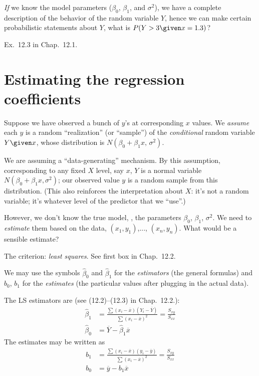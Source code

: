 \documentclass[12pt]{article}
\begin{document}
\emph{If} we know the model parameters
($\beta_0$, $\beta_1$, and $\sigma^2$),
we have a complete description of the behavior
of the random variable $Y$,
hence we can make certain probabilistic statements about $Y$,
\eg what is $P(Y > 3 \given x = 1.3)$?

\example Ex.~12.3 in Chap.~12.1.


\section{Estimating the regression coefficients}

Suppose we have observed a bunch of $y$'s at corresponding $x$ values.
We \emph{assume} each $y$ is a random ``realization'' (or ``sample'')
of the \emph{conditional} random variable
$Y\given x$, whose distribution is $N(\beta_0 + \beta_1 x,\, \sigma^2)$.

\alert
We are assuming a ``data-generating'' mechanism.
By this assumption,
corresponding to any fixed $X$ level, say $x$,
$Y$ is a normal variable $N(\beta_0 + \beta_1 x, \sigma^2)$;
our observed value $y$ is a random sample from this distribution.
(This also reinforces the interpretation about $X$:
it's not a random variable; it's whatever level of the predictor
that we ``use''.)

However, we don't know the true model,
\ie, the parameters $\beta_0$, $\beta_1$, $\sigma^2$.
We need to \emph{estimate} them based on the data,
$(x_1,y_1)$,..., $(x_n, y_n)$.
What would be a sensible estimate?

The criterion: \emph{least squares}.
See first box in Chap.~12.2.


We may use the symbols $\hat{\beta}_0$ and $\hat{\beta}_1$
for the \emph{estimators} (the general formulas)
and $b_0$, $b_1$ for the \emph{estimates} (the particular values after
plugging in the actual data).

The LS estimators are (see (12.2)--(12.3) in Chap.~12.2.):
\begin{equation}\label{eq:LS-estimator}
\begin{split}
\hat{\beta}_1 &= \frac{\sum(x_i - \overline{x})(Y_i - \overline{Y})}
        {\sum(x_i - \overline{x})^2}
    = \frac{S_{xy}}{S_{xx}}
\\
\hat{\beta}_0 &= \overline{Y} - \hat{\beta}_1\overline{x}
\end{split}
\end{equation}
The estimates may be written as
\begin{align*}
b_1 &= \frac{\sum(x_i - \overline{x})(y_i - \overline{y})}
        {\sum(x_i - \overline{x})^2}
    = \frac{S_{xy}}{S_{xx}}
\\
b_0 &= \overline{y} - b_1\overline{x}
\end{align*}
\end{document}
